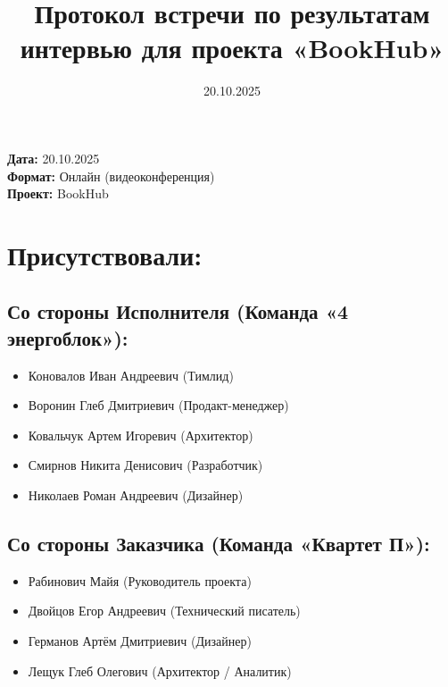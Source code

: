 \documentclass[12pt,a4paper]{article}
\title{\textbf{Протокол встречи по результатам интервью для проекта «BookHub»}}
\author{}
\date{20.10.2025}
\begin{document}
\maketitle

\vspace{1cm}

\begin{center}
\textbf{Дата:} 20.10.2025 \\
\textbf{Формат:} Онлайн (видеоконференция) \\
\textbf{Проект:} BookHub
\end{center}

\vspace{1cm}

\section*{Присутствовали:}

\subsection*{Со стороны Исполнителя (Команда «4 энергоблок»):}
\begin{itemize}[leftmargin=2cm]
    \item Коновалов Иван Андреевич (Тимлид)
    \item Воронин Глеб Дмитриевич (Продакт-менеджер)
    \item Ковальчук Артем Игоревич (Архитектор)
    \item Смирнов Никита Денисович (Разработчик)
    \item Николаев Роман Андреевич (Дизайнер)
\end{itemize}

\subsection*{Со стороны Заказчика (Команда «Квартет П»):}
\begin{itemize}[leftmargin=2cm]
    \item Рабинович Майя (Руководитель проекта)
    \item Двойцов Егор Андреевич (Технический писатель)
    \item Германов Артём Дмитриевич (Дизайнер)
    \item Лещук Глеб Олегович (Архитектор / Аналитик)
\end{itemize}

\vspace{1cm}
\end{document}
